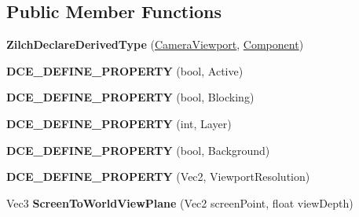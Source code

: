 \subsection*{Public Member Functions}
\begin{DoxyCompactItemize}
\item 
\hypertarget{classDCEngine_1_1Components_1_1CameraViewport_ac785b32b12b975406601025a03873cf7}{{\bfseries Zilch\-Declare\-Derived\-Type} (\hyperlink{classDCEngine_1_1Components_1_1CameraViewport}{Camera\-Viewport}, \hyperlink{classDCEngine_1_1Component}{Component})}\label{classDCEngine_1_1Components_1_1CameraViewport_ac785b32b12b975406601025a03873cf7}

\item 
\hypertarget{classDCEngine_1_1Components_1_1CameraViewport_aaa16a851fb8fdf79a15b9bb6fa8727e5}{{\bfseries D\-C\-E\-\_\-\-D\-E\-F\-I\-N\-E\-\_\-\-P\-R\-O\-P\-E\-R\-T\-Y} (bool, Active)}\label{classDCEngine_1_1Components_1_1CameraViewport_aaa16a851fb8fdf79a15b9bb6fa8727e5}

\item 
\hypertarget{classDCEngine_1_1Components_1_1CameraViewport_ac9b944257146988ca9d9137df70f7e19}{{\bfseries D\-C\-E\-\_\-\-D\-E\-F\-I\-N\-E\-\_\-\-P\-R\-O\-P\-E\-R\-T\-Y} (bool, Blocking)}\label{classDCEngine_1_1Components_1_1CameraViewport_ac9b944257146988ca9d9137df70f7e19}

\item 
\hypertarget{classDCEngine_1_1Components_1_1CameraViewport_a45ba6134c2d0cd083317bf9a12f3648a}{{\bfseries D\-C\-E\-\_\-\-D\-E\-F\-I\-N\-E\-\_\-\-P\-R\-O\-P\-E\-R\-T\-Y} (int, Layer)}\label{classDCEngine_1_1Components_1_1CameraViewport_a45ba6134c2d0cd083317bf9a12f3648a}

\item 
\hypertarget{classDCEngine_1_1Components_1_1CameraViewport_a32e88b581c4db5e4b3a852a4b5227daa}{{\bfseries D\-C\-E\-\_\-\-D\-E\-F\-I\-N\-E\-\_\-\-P\-R\-O\-P\-E\-R\-T\-Y} (bool, Background)}\label{classDCEngine_1_1Components_1_1CameraViewport_a32e88b581c4db5e4b3a852a4b5227daa}

\item 
\hypertarget{classDCEngine_1_1Components_1_1CameraViewport_a605ff48a635f807edaeaf1f12a3f1514}{{\bfseries D\-C\-E\-\_\-\-D\-E\-F\-I\-N\-E\-\_\-\-P\-R\-O\-P\-E\-R\-T\-Y} (Vec2, Viewport\-Resolution)}\label{classDCEngine_1_1Components_1_1CameraViewport_a605ff48a635f807edaeaf1f12a3f1514}

\item 
\hypertarget{classDCEngine_1_1Components_1_1CameraViewport_ac022942f3fee38bf3156b9300d325ebf}{Vec3 {\bfseries Screen\-To\-World\-View\-Plane} (Vec2 screen\-Point, float view\-Depth)}\label{classDCEngine_1_1Components_1_1CameraViewport_ac022942f3fee38bf3156b9300d325ebf}


\end{DoxyCompactItemize}
